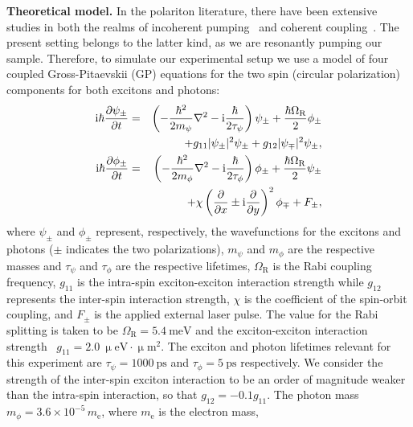 \documentclass[aps,prb,twocolumn,superscriptaddress,nofootinbib]{revtex4}
\def\edstrike#1{}
\begin{document}
{\noindent \textbf{Theoretical model.}
In the polariton literature, there have been extensive
  studies in both the realms of incoherent pumping\edstrike{, based
  on the model of Ref.}~\cite{WC2007}\edstrike{,} and coherent coupling\edstrike{,
as in Refs.}~\cite{dominici_real-space_2015,dominici_vortex_2015}.
The present setting belongs to the latter kind, as we are resonantly pumping our sample.
%
Therefore,
to simulate our experimental setup we use a model of four coupled
Gross-Pitaevskii (GP) equations for the two spin (circular polarization)
components for both excitons and photons:
%
\begin{eqnarray}
%
\label{eq:coupled_GPEs_1}
\text{i}\hbar \frac{\partial \psi_{\pm} }{\partial t} &=&
\left(-\frac{\hbar^2}{2m_\psi}\nabla^2 - \text{i} \frac{\hbar}{2\tau_\psi} \right) \psi_\pm + \frac{\hbar\Omega_\text{R}}{2}\phi_{\pm}
\\
\notag
&&
 + g_{11}|\psi_\pm|^2 \psi_\pm + g_{12} |\psi_\mp|^2\psi_\pm,
\\
%
\text{i}\hbar \frac{\partial \phi_{\pm}}{\partial t} &=&
\left(-\frac{\hbar^2}{2m_\phi}\nabla^2 - \text{i} \frac{\hbar}{2\tau_\phi}
\right) \phi_\pm + \frac{\hbar\Omega_\text{R}}{2}\psi_{\pm}
\label{eq:coupled_GPEs_2}
\\
\notag
&&
+ \chi \left( \frac{\partial}{\partial x}\pm \text{i} \frac{\partial}{\partial
  y}\right)^2 \phi_{\mp} + F_{\pm},
%
\end{eqnarray}
%
where $\psi_\pm$ and $\phi_\pm$ represent, respectively, the wavefunctions
for the excitons and photons ($\pm$ indicates the two polarizations),
$m_\psi$ and $m_\phi$ are the respective masses and
$\tau_\psi$ and $\tau_\phi$ are the respective lifetimes,
$\Omega_\text{R}$ is the Rabi coupling frequency,
$g_{11}$ is the intra-spin exciton-exciton interaction strength while
$g_{12}$ represents the inter-spin interaction strength,
$\chi$ is the coefficient of the spin-orbit coupling,
and
$F_{\pm}$ is the applied external laser pulse.
%
The value for the Rabi splitting is taken to be $\Omega_\text{R}=5.4~\text{meV}$
and the exciton-exciton interaction strength~\cite{dominici_real-space_2015}
$g_{11}=2.0~\upmu\text{eV}\cdot\upmu\text{m}^2$.
%
The exciton and photon lifetimes relevant for this experiment are
$\tau_\psi=1000~\text{ps}$ and $\tau_\phi=5~\text{ps}$ respectively.
%
We consider the strength of the inter-spin exciton interaction to be an
order of magnitude weaker than the intra-spin interaction, so that
$g_{12}=-0.1 g_{11}$.
%
The photon mass $m_{\phi}=3.6\times 10^{-5}\,m_\text{e}$, where $m_\text{e}$ is the electron mass,
}
\end{document}
